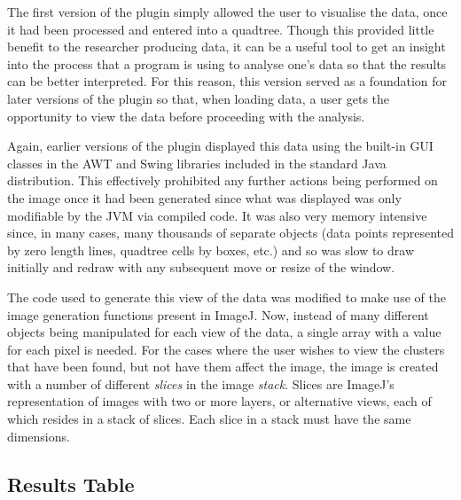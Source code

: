 The first version of the plugin simply allowed the user to visualise the data,
once it had been processed and entered into a quadtree. Though this provided
little benefit to the researcher producing data, it can be a useful tool to get
an insight into the process that a program is using to analyse one's data so
that the results can be better interpreted. For this reason, this version
served as a foundation for later versions of the plugin so that, when loading
data, a user gets the opportunity to view the data before proceeding with the
analysis.

Again, earlier versions of the plugin displayed this data using the built-in
GUI classes in the AWT\cite{zukowski1997java} and Swing\cite{loy2002java}
libraries included in the standard Java distribution. This effectively
prohibited any further actions being performed on the image once it had been
generated since what was displayed was only modifiable by the JVM via compiled
code. It was also very memory intensive since, in many cases, many thousands of
separate objects (data points represented by zero length lines, quadtree cells
by boxes, etc.) and so was slow to draw initially and redraw with any
subsequent move or resize of the window.

The code used to generate this view of the data was modified to make use of the
image generation functions present in ImageJ. Now, instead of many different
objects being manipulated for each view of the data, a single array with a
value for each pixel is needed. For the cases where the user wishes to view the
clusters that have been found, but not have them affect the image, the image is
created with a number of different \emph{slices} in the image \emph{stack}.
Slices are ImageJ's representation of images with two or more layers, or
alternative views, each of which resides in a stack of slices. Each slice in a
stack must have the same dimensions.



\subsection{Results Table}
\label{sub:results_table}

